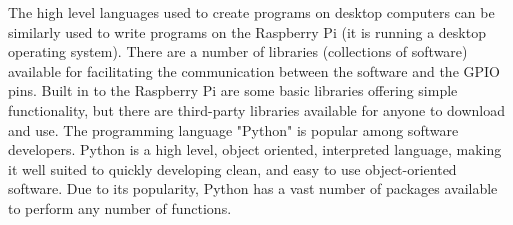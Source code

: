 \documentclass[a4]{report}
\begin{document}
	The high level languages used to create programs on desktop computers can be similarly used to write programs on the Raspberry Pi (it is running a desktop operating system). There are a number of libraries (collections of software) available for facilitating the communication between the software and the GPIO pins. Built in to the Raspberry Pi are some basic libraries offering simple functionality, but there are third-party libraries available for anyone to download and use\cite{pilibswiringpi, pilibspigpio}. The programming language "Python" is popular among software developers. Python is a high level, object oriented, interpreted language, making it well suited to quickly developing clean, and easy to use object-oriented software. Due to its popularity, Python has a vast number of packages available to perform any number of functions. \newline \newline \noindent
\end{document}
